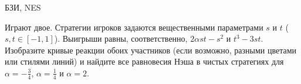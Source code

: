 \begin{problem}
\begin{source}
БЗИ, NES
\end{source}
 Играют двое. Стратегии
игроков задаются вещественными параметрами $s$ и $t$
(${s,t\in[-1,1]}$). Выигрыши равны, соответственно,
$2\alpha st-s^2$ и $t^3-3st$. Изобразите кривые реакции
обоих участников (если возможно, разными цветами или
стилями линий) и найдите все равновесия Нэша в чистых
стратегиях для $\alpha=-\frac{3}{4}$, $\alpha=\frac{1}{4}$ и
$\alpha=2$.



\begin{sol}

\end{sol}
\end{problem}




